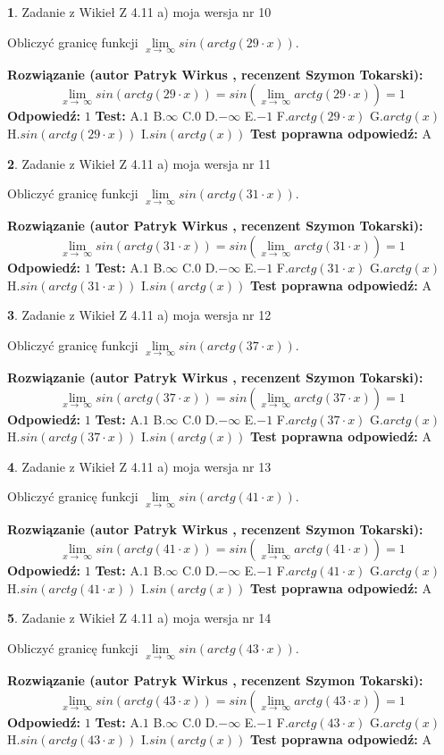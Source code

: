 \documentclass[12pt, a4paper]{article}
\theoremstyle{definition} %
\newtheorem{zad}{}
\newcommand{\zadStart}[1]{\begin{zad}#1\newline}
\newcommand{\zadStop}{\end{zad}}
\newcommand{\rozwStart}[2]{\noindent \textbf{Rozwiązanie (autor #1 , recenzent #2): }\newline}
\newcommand{\rozwStop}{\newline}
\newcommand{\odpStart}{\noindent \textbf{Odpowiedź:}\newline}
\newcommand{\odpStop}{\newline}
\newcommand{\testStart}{\noindent \textbf{Test:}\newline}
\newcommand{\testStop}{\newline}
\newcommand{\kluczStart}{\noindent \textbf{Test poprawna odpowiedź:}\newline}
\newcommand{\kluczStop}{\newline}
\begin{document}
\zadStart{Zadanie z Wikieł Z 4.11 a) moja wersja nr 10}

Obliczyć granicę funkcji  $\lim\limits_{x\to\ \infty}sin(arctg(29\cdot x))$.
\zadStop
\rozwStart{Patryk Wirkus}{Szymon Tokarski}
$$\lim\limits_{x\to\ \infty}sin(arctg(29\cdot x)) = sin(\lim\limits_{x\to\ \infty}arctg(29\cdot x)) = 1$$
\rozwStop
\odpStart
$1$
\odpStop
\testStart
A.$1$ B.$\infty$ C.$0$ D.$-\infty$ E.$-1$
F.$arctg(29\cdot x)$ G.$arctg(x)$
H.$sin(arctg(29\cdot x))$
I.$sin(arctg(x))$
\testStop
\kluczStart
A
\kluczStop



\zadStart{Zadanie z Wikieł Z 4.11 a) moja wersja nr 11}

Obliczyć granicę funkcji  $\lim\limits_{x\to\ \infty}sin(arctg(31\cdot x))$.
\zadStop
\rozwStart{Patryk Wirkus}{Szymon Tokarski}
$$\lim\limits_{x\to\ \infty}sin(arctg(31\cdot x)) = sin(\lim\limits_{x\to\ \infty}arctg(31\cdot x)) = 1$$
\rozwStop
\odpStart
$1$
\odpStop
\testStart
A.$1$ B.$\infty$ C.$0$ D.$-\infty$ E.$-1$
F.$arctg(31\cdot x)$ G.$arctg(x)$
H.$sin(arctg(31\cdot x))$
I.$sin(arctg(x))$
\testStop
\kluczStart
A
\kluczStop



\zadStart{Zadanie z Wikieł Z 4.11 a) moja wersja nr 12}

Obliczyć granicę funkcji  $\lim\limits_{x\to\ \infty}sin(arctg(37\cdot x))$.
\zadStop
\rozwStart{Patryk Wirkus}{Szymon Tokarski}
$$\lim\limits_{x\to\ \infty}sin(arctg(37\cdot x)) = sin(\lim\limits_{x\to\ \infty}arctg(37\cdot x)) = 1$$
\rozwStop
\odpStart
$1$
\odpStop
\testStart
A.$1$ B.$\infty$ C.$0$ D.$-\infty$ E.$-1$
F.$arctg(37\cdot x)$ G.$arctg(x)$
H.$sin(arctg(37\cdot x))$
I.$sin(arctg(x))$
\testStop
\kluczStart
A
\kluczStop



\zadStart{Zadanie z Wikieł Z 4.11 a) moja wersja nr 13}

Obliczyć granicę funkcji  $\lim\limits_{x\to\ \infty}sin(arctg(41\cdot x))$.
\zadStop
\rozwStart{Patryk Wirkus}{Szymon Tokarski}
$$\lim\limits_{x\to\ \infty}sin(arctg(41\cdot x)) = sin(\lim\limits_{x\to\ \infty}arctg(41\cdot x)) = 1$$
\rozwStop
\odpStart
$1$
\odpStop
\testStart
A.$1$ B.$\infty$ C.$0$ D.$-\infty$ E.$-1$
F.$arctg(41\cdot x)$ G.$arctg(x)$
H.$sin(arctg(41\cdot x))$
I.$sin(arctg(x))$
\testStop
\kluczStart
A
\kluczStop



\zadStart{Zadanie z Wikieł Z 4.11 a) moja wersja nr 14}

Obliczyć granicę funkcji  $\lim\limits_{x\to\ \infty}sin(arctg(43\cdot x))$.
\zadStop
\rozwStart{Patryk Wirkus}{Szymon Tokarski}
$$\lim\limits_{x\to\ \infty}sin(arctg(43\cdot x)) = sin(\lim\limits_{x\to\ \infty}arctg(43\cdot x)) = 1$$
\rozwStop
\odpStart
$1$
\odpStop
\testStart
A.$1$ B.$\infty$ C.$0$ D.$-\infty$ E.$-1$
F.$arctg(43\cdot x)$ G.$arctg(x)$
H.$sin(arctg(43\cdot x))$
I.$sin(arctg(x))$
\testStop
\kluczStart
A
\kluczStop
\end{document}
